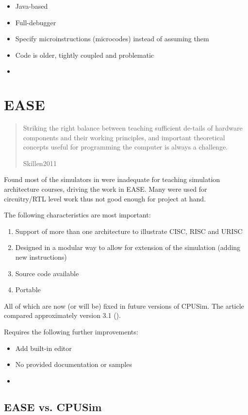 \begin{itemize}
\item Java-based
\item Full-debugger
\item Specify microinstructions (microcodes) instead of assuming them
\item Code is older, tightly coupled and problematic
\item 
\end{itemize}

\section{EASE}

\cite{Skillen2011}

\blockquote[Skillen2011]{Striking the right balance between teaching sufficient de-tails of hardware components and their working principles, and important theoretical concepts useful for programming the computer is always a challenge.}

Found most of the simulators in \cite{Nikolic2009} were inadequate for teaching simulation architecture courses, driving the work in EASE. Many were used for circuitry/RTL level work thus not good enough for project at hand. 

The following characteristics are most important: 

\begin{enumerate}
\item Support of more than one architecture to illustrate CISC, RISC and URISC
\item Designed in a modular way to allow for extension of the simulation (adding new instructions)
\item Source code available
\item Portable
\end{enumerate}

All of which are now (or will be) fixed in future versions of CPUSim. The article compared approximately version 3.1 (\cite{Skrien2001}). 

Requires the following further improvements: 

\begin{itemize}
\item Add built-in editor
\item No provided documentation or samples
\item 
\end{itemize}

\subsection{EASE vs. CPUSim}

